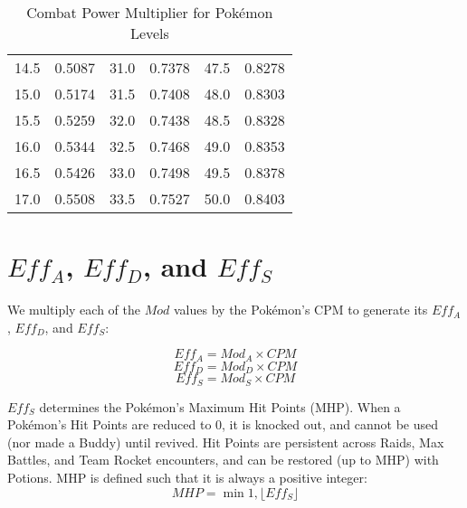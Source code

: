 \begin{table}
\begin{center}
\begin{tabular}{l l l l l l}
14.5 & 0.5087 & 31.0 & 0.7378 & 47.5 & 0.8278 \\
15.0 & 0.5174 & 31.5 & 0.7408 & 48.0 & 0.8303 \\
15.5 & 0.5259 & 32.0 & 0.7438 & 48.5 & 0.8328 \\
16.0 & 0.5344 & 32.5 & 0.7468 & 49.0 & 0.8353 \\
16.5 & 0.5426 & 33.0 & 0.7498 & 49.5 & 0.8378 \\
17.0 & 0.5508 & 33.5 & 0.7527 & 50.0 & 0.8403 \\
\end{tabular}
\caption{Combat Power Multiplier for Pokémon Levels}
\label{table:cpm}
\end{center}
\end{table}

\section{$Eff_A$, $Eff_D$, and $Eff_S$}
We multiply each of the $Mod$ values by the Pokémon's CPM to generate
 its $Eff_A$, $Eff_D$, and $Eff_S$:

\[ Eff_A = Mod_A \times CPM \]
\[ Eff_D = Mod_D \times CPM \]
\[ Eff_S = Mod_S \times CPM \]

$Eff_S$ determines the Pokémon's Maximum Hit Points (MHP).
When a Pokémon's Hit Points are reduced to 0, it is knocked out, and cannot be
 used (nor made a Buddy) until revived.
Hit Points are persistent across Raids, Max Battles, and Team Rocket encounters,
 and can be restored (up to MHP) with Potions.
MHP is defined such that it is always a positive integer:
\[ MHP = \min{1, \lfloor Eff_S \rfloor} \]

